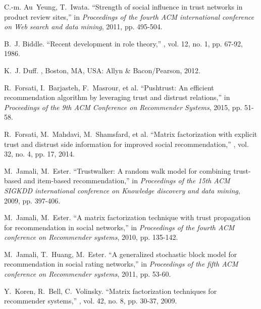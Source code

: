 \documentclass{ieeeaccess}
\begin{document}
\begin{thebibliography}{10}

C.-m. Au~Yeung, T.~Iwata.
\newblock ``Strength of social influence in trust networks in product review sites,''
\newblock in {\em Proceedings of the fourth ACM international conference on Web search and data mining}, 2011, pp. 495-504.

B.~J. Biddle.
\newblock ``Recent development in role theory,''
, vol. 12, no. 1, pp. 67-92, 1986.

K.~J. Duff.
,
\newblock Boston, MA, USA:  Allyn \& Bacon/Pearson, 2012.

R.~Forsati, I.~Barjasteh, F.~Masrour, et al.
\newblock ``Pushtrust: An efficient recommendation algorithm by leveraging trust and distrust relations,''
\newblock in {\em Proceedings of the 9th ACM Conference on Recommender Systems}, 2015, pp. 51-58.

R.~Forsati, M.~Mahdavi, M.~Shamsfard, et al.
\newblock ``Matrix factorization with explicit trust and distrust side information for improved social recommendation,''
, vol. 32, no. 4, pp. 17, 2014.

M.~Jamali, M.~Ester.
\newblock ``Trustwalker: A random walk model for combining trust-based and item-based recommendation,''
\newblock in {\em Proceedings of the 15th ACM SIGKDD international conference on Knowledge discovery and data mining}, 2009, pp. 397-406.

M.~Jamali, M.~Ester.
\newblock ``A matrix factorization technique with trust propagation for recommendation in social networks,''
\newblock in {\em Proceedings of the fourth ACM conference on Recommender systems}, 2010, pp. 135-142.

M.~Jamali, T.~Huang, M.~Ester.
\newblock ``A generalized stochastic block model for recommendation in social rating networks,''
\newblock in {\em Proceedings of the fifth ACM conference on Recommender systems}, 2011, pp. 53-60.

Y.~Koren, R.~Bell, C.~Volinsky.
\newblock ``Matrix factorization techniques for recommender systems,''
, vol. 42, no. 8, pp. 30-37, 2009.


\end{thebibliography}
\end{document}
